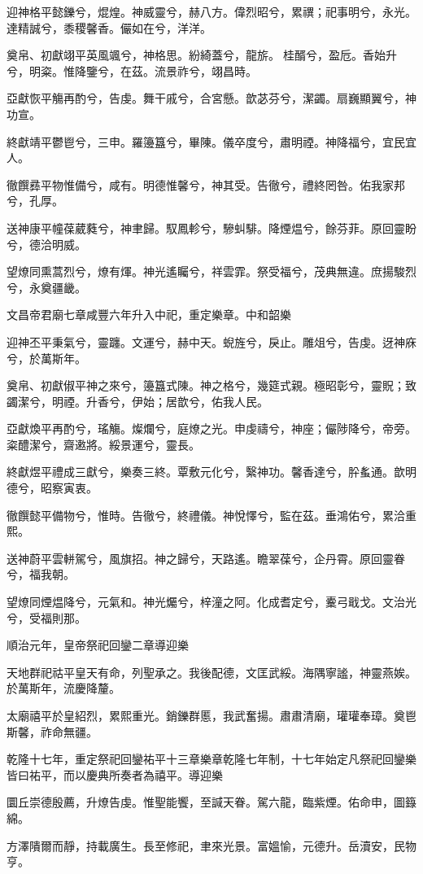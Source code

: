 \begin{pinyinscope}
迎神格平懿鑠兮，焜煌。神威靈兮，赫八方。偉烈昭兮，累禩；祀事明兮，永光。達精誠兮，黍稷馨香。儼如在兮，洋洋。

奠帛、初獻翊平英風颯兮，神格思。紛綺蓋兮，龍旂。桂醑兮，盈卮。香始升兮，明粢。惟降鑒兮，在茲。流景祚兮，翊昌時。

亞獻恢平觴再酌兮，告虔。舞干戚兮，合宮懸。歆苾芬兮，潔蠲。扇巍顯翼兮，神功宣。

終獻靖平鬱鬯兮，三申。羅籩簋兮，畢陳。儀卒度兮，肅明禋。神降福兮，宜民宜人。

徹饌彞平物惟備兮，咸有。明德惟馨兮，神其受。告徹兮，禮終罔咎。佑我家邦兮，孔厚。

送神康平幢葆葳蕤兮，神聿歸。馭鳳軫兮，驂虯騑。降煙煴兮，餘芬菲。原回靈盼兮，德洽明威。

望燎同熏蒿烈兮，燎有煇。神光遙矚兮，祥雲霏。祭受福兮，茂典無違。庶揚駿烈兮，永奠疆畿。

文昌帝君廟七章咸豐六年升入中祀，重定樂章。中和韶樂

迎神丕平秉氣兮，靈躔。文運兮，赫中天。蜺旌兮，戾止。雕俎兮，告虔。迓神庥兮，於萬斯年。

奠帛、初獻俶平神之來兮，籩簋式陳。神之格兮，幾筵式親。極昭彰兮，靈貺；致蠲潔兮，明禋。升香兮，伊始；居歆兮，佑我人民。

亞獻煥平再酌兮，瑤觴。燦爛兮，庭燎之光。申虔禱兮，神座；儼陟降兮，帝旁。粢醴潔兮，齋遫將。綏景運兮，靈長。

終獻煜平禮成三獻兮，樂奏三終。覃敷元化兮，繄神功。馨香達兮，肸蚃通。歆明德兮，昭察寅衷。

徹饌懿平備物兮，惟時。告徹兮，終禮儀。神悅懌兮，監在茲。垂鴻佑兮，累洽重熙。

送神蔚平雲軿駕兮，風旗招。神之歸兮，天路遙。瞻翠葆兮，企丹霄。原回靈眷兮，福我朝。

望燎同煙煴降兮，元氣和。神光爥兮，梓潼之阿。化成耆定兮，櫜弓戢戈。文治光兮，受福則那。

順治元年，皇帝祭祀回鑾二章導迎樂

天地群祀祜平皇天有命，列聖承之。我後配德，文匡武綏。海隅寧謐，神靈燕娭。於萬斯年，流慶降釐。

太廟禧平於皇紹烈，累熙重光。銷鑠群慝，我武奮揚。肅肅清廟，瓘瓘奉璋。奠鬯斯馨，祚命無疆。

乾隆十七年，重定祭祀回鑾祐平十三章樂章乾隆七年制，十七年始定凡祭祀回鑾樂皆曰祐平，而以慶典所奏者為禧平。導迎樂

圜丘崇德殷薦，升燎告虔。惟聖能饗，至諴天眷。駕六龍，臨紫煙。佑命申，圖籙綿。

方澤隤爾而靜，持載廣生。長至修祀，聿來光景。富媼愉，元德升。岳瀆安，民物亨。


\end{pinyinscope}
